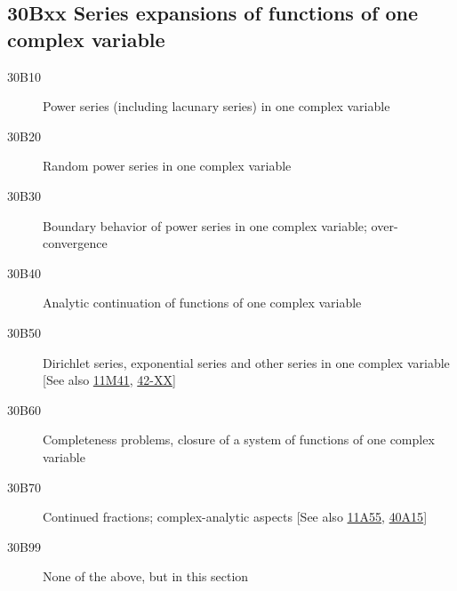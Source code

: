 \documentclass[letterpaper]{article}
\begin{document}
\subsection*{30Bxx  Series expansions of functions of one complex variable }\label{30Bxx}
\begin{description}  
\item [30B10]\label{30B10} Power series (including lacunary series) in one complex variable 
\item [30B20]\label{30B20} Random power series in one complex variable
\item [30B30]\label{30B30} Boundary behavior of power series in one complex variable; over-convergence
\item [30B40]\label{30B40} Analytic continuation of  functions of one complex variable 
\item [30B50]\label{30B50} Dirichlet series,  exponential series and other series  in one complex variable [See also \hyperref[11M41]{11M41}, \hyperref[42-XX]{42-XX}]
\item [30B60]\label{30B60} Completeness problems, closure of a system of functions of one complex variable
\item [30B70]\label{30B70} Continued fractions; complex-analytic aspects [See also \hyperref[11A55]{11A55}, \hyperref[40A15]{40A15}]
\item [30B99]\label{30B99} None of the above, but in this section
\end{description}
\end{document}
